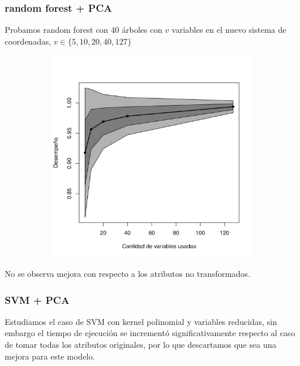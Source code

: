 \documentclass[a4paper,10pt]{article}
\begin{document}
\subsubsection{random forest + PCA}

Probamos random forest con 40 \'arboles con $v$ variables en el nuevo sistema de coordenadas, $v \in \{5,10,20,40,127\}$

\begin{figure}[H]
  \centering
  \begin{subfigure}[b]{0.4\textwidth}
    \includegraphics[width=\textwidth]{../imagenes/rf}
     
  \end{subfigure}
  \caption{}
  \label{fig:rf}
\end{figure}

No se observa mejora con respecto a los atributos no transformados. 

\subsubsection{SVM + PCA}

\par Estudiamos el caso de SVM con kernel polinomial y variables reducidas, sin embargo el tiempo de ejecución se incrementó significativamente respecto al caso de tomar todas los atributos originales, por lo que descartamos que sea una mejora para este modelo.
\end{document}
